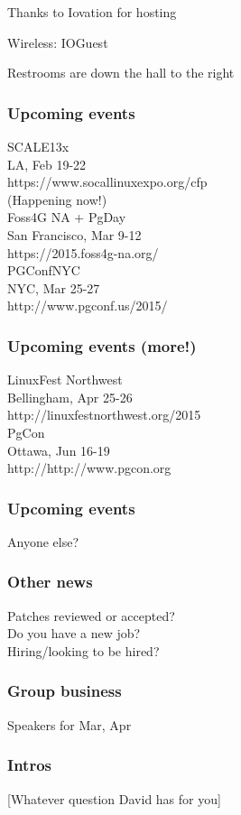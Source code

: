 \documentclass{beamer}
\begin{document}

\frame
{
  \begin{center}
  \item[]Thanks to Iovation for hosting
  \item[]Wireless: IOGuest
  \item[]Restrooms are down the hall to the right
  \end{center}
}

\frame
{
  \frametitle{Upcoming events}
  \begin{center}
{\large SCALE13x\\}
LA, Feb 19-22\\
https://www.socallinuxexpo.org/cfp\\
(Happening now!)\\
\vspace{5 mm}
{\large Foss4G NA + PgDay\\}
San Francisco, Mar 9-12\\
https://2015.foss4g-na.org/\\
\vspace{5 mm}
{\large PGConfNYC\\}
NYC, Mar 25-27\\
http://www.pgconf.us/2015/\\
  \end{center}
}

\frame
{
  \frametitle{Upcoming events (more!)}
  \begin{center}
{\large LinuxFest Northwest\\}
Bellingham, Apr 25-26\\
http://linuxfestnorthwest.org/2015\\
\vspace{5 mm}
{\large PgCon\\}
Ottawa, Jun 16-19\\
http://http://www.pgcon.org\\
  \end{center}
}

\frame
{
  \frametitle{Upcoming events}
  \begin{center}
Anyone else?
  \end{center}
}

\frame
{
  \frametitle{Other news}
  \begin{center}
Patches reviewed or accepted?\\
Do you have a new job?\\
Hiring/looking to be hired?\\
  \end{center}
}

\frame
{
  \frametitle{Group business}
  \begin{center}
Speakers for Mar, Apr\\
  \end{center}
}

\frame
{
  \frametitle{Intros}
  \begin{center}
[Whatever question David has for you]\\
  \end{center}
}
\end{document}
